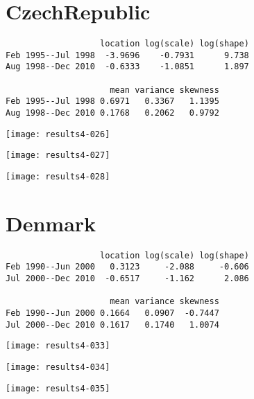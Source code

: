 \documentclass[a4paper]{article}
\begin{document}
\newpage

\section*{CzechRepublic}


\begin{verbatim}
                   location log(scale) log(shape)
Feb 1995--Jul 1998  -3.9696    -0.7931      9.738
Aug 1998--Dec 2010  -0.6333    -1.0851      1.897

                     mean variance skewness
Feb 1995--Jul 1998 0.6971   0.3367   1.1395
Aug 1998--Dec 2010 0.1768   0.2062   0.9792

\end{verbatim}

\begin{center}
\texttt{[image: results4-026]}

\texttt{[image: results4-027]}

\texttt{[image: results4-028]}
\end{center}


\newpage

\section*{Denmark}


\begin{verbatim}
                   location log(scale) log(shape)
Feb 1990--Jun 2000   0.3123     -2.088     -0.606
Jul 2000--Dec 2010  -0.6517     -1.162      2.086

                     mean variance skewness
Feb 1990--Jun 2000 0.1664   0.0907  -0.7447
Jul 2000--Dec 2010 0.1617   0.1740   1.0074

\end{verbatim}

\begin{center}
\texttt{[image: results4-033]}

\texttt{[image: results4-034]}

\texttt{[image: results4-035]}
\end{center}

\newpage
\end{document}
